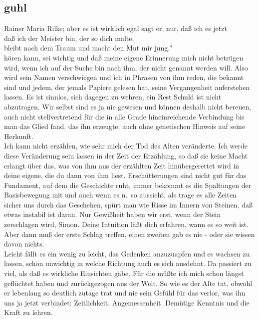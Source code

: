 \documentclass[
]{article}
\author{}
\date{\vspace{-2.5em}}
\begin{document}
\subsection{guhl}\label{guhl}

Rainer Maria Rilke; aber es ist wirklich egal sagt er, nur, daß ich es
jetzt\\
daß ich der Meister bin, der so dich malte,\\
bleibt nach dem Traum und macht den Mut mir jung."\\
hören kann, sei wichtig und daß meine eigene Erinnerung mich nicht
betrügen wird, wenn ich auf der Suche bin nach ihm, der nicht genannt
werden will. Also wird sein Namen verschwiegen und ich in Phrasen von
ihm reden, die bekannt sind und jedem, der jemals Papiere gelesen hat,
seine Vergangenheit auferstehen lassen. Es ist sinnlos, sich dagegen zu
wehren, ein Rest Schuld ist nicht abzutragen. Wir selbst sind es ja nie
gewesen und können deshalb nicht bereuen, auch nicht stellvertretend für
die in alle Grade hineinreichende Verbindung bis man das Glied fand, das
ihn erzeugte; auch ohne genetischen Hinweis auf seine Herkunft.\\
Ich kann nicht erzählen, wie sehr mich der Tod des Alten veränderte. Ich
werde diese Veränderung sein lassen in der Zeit der Erzählung, so daß
sie keine Macht erlangt über das, was von ihm aus der erzählten Zeit
hinübergerettet wird in deine eigene, die du dann von ihm liest.
Erschütterungen sind nicht gut für das Fundament, auf dem die Geschichte
ruht, immer bekommt es die Spaltungen der Basisbewegung mit und auch
wenn es n.~so aussieht, als trage es alle Zeiten sicher uns durch das
Geschehen, spürt man wie Risse im Innern von Steinen, daß etwas instabil
ist daran. Nur Gewißheit haben wir erst, wenn der Stein zerschlagen
wird, Simon. Deine Intuition läßt dich erfahren, wann es so weit ist.
Aber dann muß der erste Schlag treffen, einen zweiten gab es nie - oder
sie wissen davon nichts.\\
Leicht fällt es ein wenig zu leicht, das Gedenken anzuzuapfen und es
wachsen zu lassen, schon unwichtig in welche Richtung auch es sich
ausdehnt. Da passiert zu viel, als daß es wirkliche Einsichten gäbe. Für
die müßte ich mich schon längst geflüchtet haben und zurückgezogen aus
der Welt. So wie es der Alte tat, obwohl er lebenlang so deutlich zutage
trat und nie sein Gefühl für das verlor, was ihn uns ja jetzt verbindet:
Zeitlichkeit. Angemessenheit. Demütige Kenntnis und die Kraft zu lehren.
\end{document}
